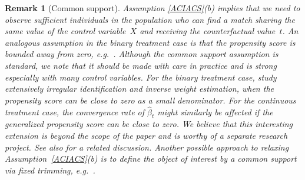 \documentclass[lettersize, 12pt]{article}
\newtheorem{remark}{Remark}
\begin{document}
\begin{remark}[Common support] {\rm 
Assumption \ref{ACIACS}(b) implies that we need to observe sufficient individuals in the population who can find a match sharing the same value of the control variable~$X$ and receiving the counterfactual value~$t$.
An analogous assumption in the binary treatment case is that the propensity score is bounded away from zero, e.g.\ \cite{HIR03ETA}. 
Although the common support assumption is standard,  
we note that it should be made with care in practice and is strong especially with many control variables.
For the binary treatment case, \cite{KT} study extensively irregular identification and inverse weight estimation, when the propensity score can be close to zero as a small denominator.
For the continuous treatment case, the convergence rate of $\hat\beta_t$ might similarly be affected if the generalized propensity score can be close to zero.
We believe that this interesting extension is beyond the scope of the paper and is worthy of a separate research project.
See also \cite{SUZ} for a related discussion.
Another possible approach to relaxing Assumption~\ref{ACIACS}(b) is to define the object of interest by a common support via fixed trimming, e.g.\ \cite{Lee}.
}
\label{RCS}
\end{remark}
\end{document}
